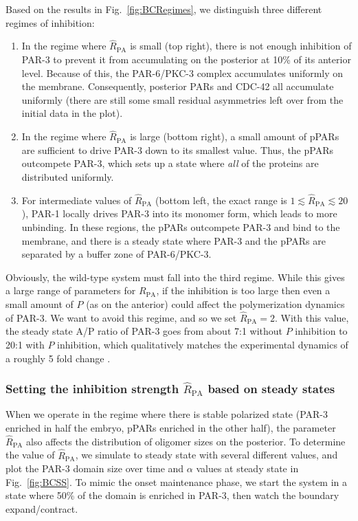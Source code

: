 \documentclass[11pt]{article}
\newcommand{\6}[1]{#1_{\text{6}}}
\newcommand{\3}[1]{#1_{\text{3}}}
\begin{document}
Based on the results in Fig.\ \ref{fig:BCRegimes}, we distinguish three different regimes of inhibition:
\begin{enumerate}
\item In the regime where $\hat R_\text{PA}$ is small (top right), there is not enough inhibition of PAR-3 to prevent it from accumulating on the posterior at 10\% of its anterior level. Because of this, the PAR-6/PKC-3 complex accumulates uniformly on the membrane. Consequently, posterior PARs and CDC-42 all accumulate uniformly (there are still some small residual asymmetries left over from the initial data in the plot). 
\item In the regime where $\hat R_\text{PA}$ is large (bottom right), a small amount of pPARs are sufficient to drive PAR-3 down to its smallest value. Thus, the pPARs outcompete PAR-3, which sets up a state where \emph{all} of the proteins are distributed uniformly. 
\item For intermediate values of $\hat R_\text{PA}$ (bottom left, the exact range is $1 \lesssim \hat R_\text{PA} \lesssim 20$), PAR-1 locally drives PAR-3 into its monomer form, which leads to more unbinding. In these regions, the pPARs outcompete PAR-3 and bind to the membrane, and there is a steady state where PAR-3 and the pPARs are separated by a buffer zone of PAR-6/PKC-3.
\end{enumerate}
Obviously, the wild-type system must fall into the third regime. While this gives a large range of parameters for $R_\text{PA}$, if the inhibition is too large then even a small amount of $P$ (as on the anterior) could affect the polymerization dynamics of PAR-3. We want to avoid this regime, and so we set $\hat R_\text{PA}=2$. With this value, the steady state A/P ratio of PAR-3 goes from about 7:1 without $P$ inhibition to 20:1 with $P$ inhibition, which qualitatively matches the experimental dynamics of a roughly 5 fold change \cite[Fig.~4c]{sailer2015dynamic}. 

\subsubsection{Setting the inhibition strength $\hat R_\text{PA}$ based on steady states}
When we operate in the regime where there is stable polarized state (PAR-3 enriched in half the embryo, pPARs enriched in the other half), the parameter $\hat R_\text{PA}$ also affects the distribution of oligomer sizes on the posterior. To determine the value of $\hat R_\text{PA}$, we simulate to steady state with several different values, and plot the PAR-3 domain size over time and $\alpha$ values at steady state in Fig.\ \ref{fig:BCSS}. To mimic the onset maintenance phase, we start the system in a state where 50\% of the domain is enriched in PAR-3, then watch the boundary expand/contract.
\end{document}
